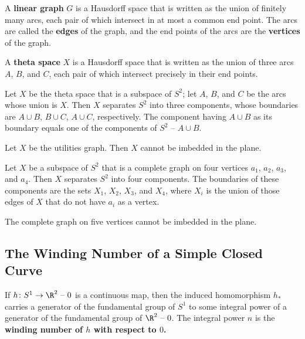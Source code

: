 \begin{definition}
A \textbf{linear graph} $G$ is a Hausdorff space that is written as the union of finitely many arcs, 
each pair of which intersect in at most a common end point. The arcs are called the \textbf{edges} of the graph, and the end points of the arcs are the \textbf{vertices} of the graph.
\end{definition}

\begin{definition}
A \textbf{theta space} $X$ is a Hausdorff space that is written as the union of three arcs $A$, $B$, and $C$, each pair
of which intersect precisely in their end points.
\end{definition}

\begin{lemma}
Let $X$ be the theta space that is a subspace of $S^2$; let $A$, $B$, and $C$ be the arcs whose union is $X$. Then $X$ separates $S^2$ into three components,
whose boundaries are $A \cup B$, $B \cup C$, $A \cup C$, respectively. The component having $A \cup B$ as its boundary equals one of the components of $S^2 \text{ -- } A \cup B$. 
\end{lemma}

\begin{theorem}
Let $X$ be the utilities graph. Then $X$ cannot be imbedded in the plane.
\end{theorem}

\begin{lemma}
Let $X$ be a subspace of $S^2$ that is a complete graph on four vertices $a_1$, $a_2$, $a_3$, and $a_4$. Then $X$ separates $S^2$ into four components.
The boundaries of these components are the sets $X_1$, $X_2$, $X_3$, and $X_4$, where $X_i$ is the union of those edges of $X$ that do not have $a_i$ as a vertex.
\end{lemma}

\begin{theorem}
The complete graph on five vertices cannot be imbedded in the plane.
\end{theorem}

\subsection{The Winding Number of a Simple Closed Curve}

\begin{definition}
If $h\colon S^1 \rightarrow \R^2 \text{ -- } 0$ is a continuous map, then the induced homomorphism $h_{\ast}$ carries a generator of the
fundamental group of $S^1$ to some integral power of a generator of the fundamental group of $\R^2 \text{ -- } 0$. The integral power $n$ is the \textbf{winding number of $h$ with respect to $0$.} 
\end{definition}

